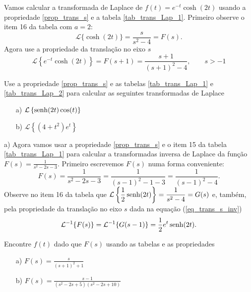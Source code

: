 \documentclass[Main.tex]{subfiles}
\begin{document}
\begin{ex}Vamos calcular a transformada de Laplace de $f(t)=e^{-t}\cosh(2t)$ usando a propriedade \ref{prop_trans_s} e a tabela \ref{tab_trans_Lap_1}. Primeiro observe o item 16 da tabela com $a=2$:
$$
\mathcal{L}\{\cosh(2t)\}=\frac{s}{ s^2-4}=F(s).
$$
Agora use a propriedade da translação no eixo $s$
\begin{equation}
\mathcal{L}\left\{e^{-t}\cosh(2t)\right\} =F(s+1)=\frac{s+1}{ (s+1)^2-4},\qquad s>-1
\end{equation}


\end{ex}
\begin{prob}Use a propriedade \ref{prop_trans_s} e as tabelas \ref{tab_trans_Lap_1} e \ref{tab_trans_Lap_2} para calcular as seguintes transformadas de Laplace
\begin{itemize}
 \item[a)] $\displaystyle \mathcal{L}\left\{\operatorname{senh}(2t)\cos(t)\right\}$
 \item[b)] $\displaystyle \mathcal{L}\left\{(4+t^2)e^t\right\}$
\end{itemize}
\end{prob}
\begin{ex}
 \item[a)] Agora vamos usar a propriedade \ref{prop_trans_s} e o item 15 da tabela \ref{tab_trans_Lap_1} para calcular a transformadas inversa de Laplace da função $F(s)=\frac{1}{s^2-2s-3}$. Primeiro escrevemos $F(s)$ numa forma conveniente:
$$
F(s)=\frac{1}{s^2-2s-3}=\frac{1}{(s-1)^2-1-3}=\frac{1}{(s-1)^2-4}.
$$
Observe no item 16 da tabela que $\displaystyle\mathcal{L}\left\{\frac{1}{2}\operatorname{senh}(2t)\right\}=\frac{1}{ s^2-4}=G(s)$ e, também, pela propriedade da translação no eixo $s$ dada na equação (\ref{eq_trans_s_inv})
$$
\mathcal{L}^{-1}\{F(s)\}=\mathcal{L}^{-1}\{G(s-1)\}=\frac{1}{2}e^{t}\operatorname{senh}(2t).
$$
\end{ex}

\begin{prob}Encontre $f(t)$ dado que $F(s)$ usando as tabelas e as propriedades
\begin{itemize}
 \item[a)] $F(s)=\frac{s}{(s+1)^2+1}$
\item[b)] $F(s)=\frac{s-1}{(s^2-2s+5)(s^2-2s+10)}$
\end{itemize}
\end{prob}
\end{document}

